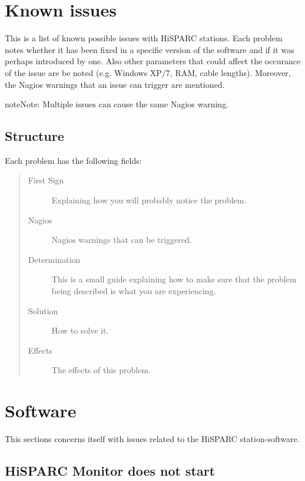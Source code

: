 \documentclass[a4paper,11pt,english]{sphinxmanual}
\begin{document}
\chapter{Known issues}
\label{known-issues:known-issues}\label{known-issues::doc}
This is a list of known possible issues with HiSPARC stations.
Each problem notes whether it has been fixed in a specific
version of the software and if it was perhaps introduced by one.
Also other parameters that could affect the occurance of the issue
are be noted (e.g. Windows XP/7, RAM, cable lengths).
Moreover, the Nagios warnings that an issue can trigger are mentioned.

\begin{notice}{note}{Note:}
Multiple issues can cause the same Nagios warning.
\end{notice}


\section{Structure}
\label{known-issues:structure}
Each problem has the following fields:
\begin{quote}\begin{description}
\item[{First Sign}] \leavevmode
Explaining how you will probably notice the problem.

\item[{Nagios}] \leavevmode
Nagios warnings that can be triggered.

\item[{Determination}] \leavevmode
This is a small guide explaining how to make sure that the problem being described is what you are experiencing.

\item[{Solution}] \leavevmode
How to solve it.

\item[{Effects}] \leavevmode
The effects of this problem.

\end{description}\end{quote}


\chapter{Software}
\label{known-issues:software}
This sections concerns itself with issues related to the HiSPARC
station-software.


\section{HiSPARC Monitor does not start}
\label{known-issues:hisparc-monitor-does-not-start}
\end{document}
